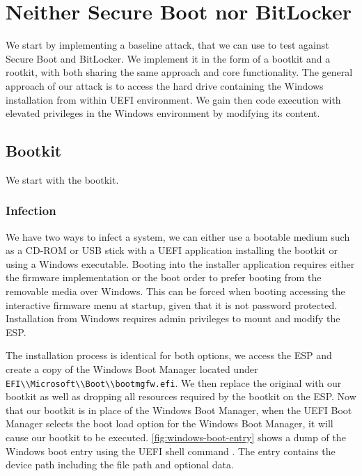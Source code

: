 
\section{Neither Secure Boot nor BitLocker}

We start by implementing a baseline attack, that we can use to test against Secure Boot and BitLocker.
We implement it in the form of a bootkit and a rootkit, with both sharing the same approach and core functionality.
The general approach of our attack is to access the hard drive containing the Windows installation from within \ac{UEFI} environment.
We gain then code execution with elevated privileges in the Windows environment by modifying its content.

\subsection{Bootkit}
\label{sec:attacks:neither:bootkit}

We start with the bootkit.

\subsubsection{Infection}

We have two ways to infect a system, we can either use a bootable medium such as a CD-ROM or \ac{USB} stick with a \ac{UEFI} application installing the bootkit or using a Windows executable.
Booting into the installer application requires either the firmware implementation or the boot order to prefer booting from the removable media over Windows.
This can be forced when booting accessing the interactive firmware menu at startup, given that it is not password protected.
Installation from Windows requires admin privileges to mount and modify the \ac{ESP}.

The installation process is identical for both options, we access the \ac{ESP} and create a copy of the Windows Boot Manager located under \lstinline{EFI\\Microsoft\\Boot\\bootmgfw.efi}.
We then replace the original with our bootkit as well as dropping all resources required by the bootkit on the \ac{ESP}.
Now that our bootkit is in place of the Windows Boot Manager, when the \ac{UEFI} Boot Manager selects the boot load option for the Windows Boot Manager, it will cause our bootkit to be executed.
\autoref{fig:windows-boot-entry} shows a dump of the Windows boot entry using the \ac{UEFI} shell command .
The entry contains the device path including the file path and optional data.

